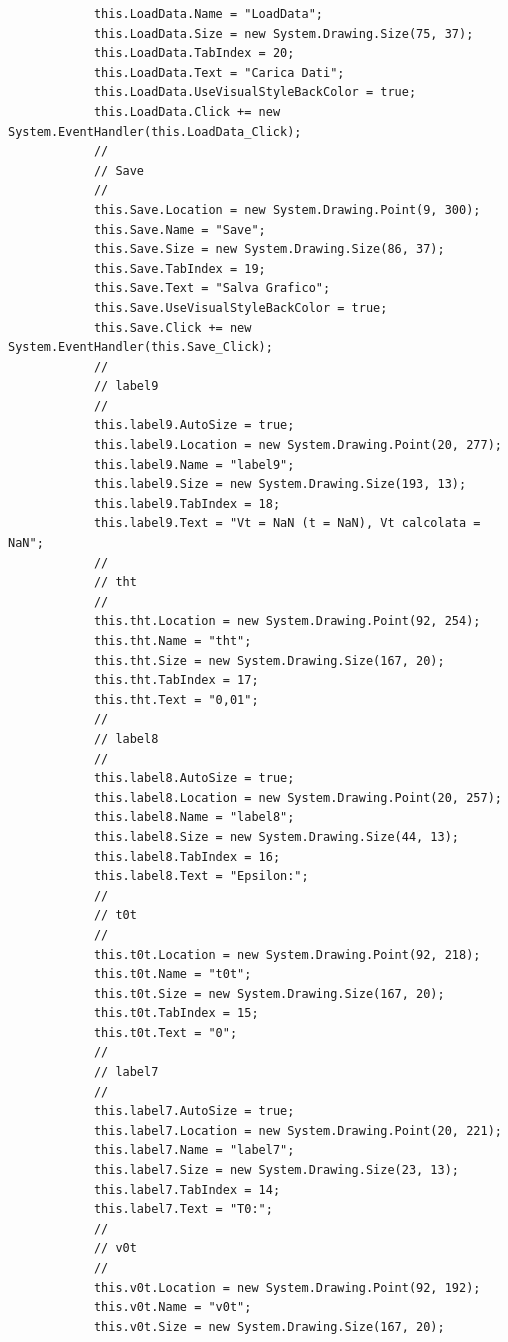 \documentclass[11pt]{article} %
\begin{document}
\begin{lstlisting}
            this.LoadData.Name = "LoadData";
            this.LoadData.Size = new System.Drawing.Size(75, 37);
            this.LoadData.TabIndex = 20;
            this.LoadData.Text = "Carica Dati";
            this.LoadData.UseVisualStyleBackColor = true;
            this.LoadData.Click += new System.EventHandler(this.LoadData_Click);
            // 
            // Save
            // 
            this.Save.Location = new System.Drawing.Point(9, 300);
            this.Save.Name = "Save";
            this.Save.Size = new System.Drawing.Size(86, 37);
            this.Save.TabIndex = 19;
            this.Save.Text = "Salva Grafico";
            this.Save.UseVisualStyleBackColor = true;
            this.Save.Click += new System.EventHandler(this.Save_Click);
            // 
            // label9
            // 
            this.label9.AutoSize = true;
            this.label9.Location = new System.Drawing.Point(20, 277);
            this.label9.Name = "label9";
            this.label9.Size = new System.Drawing.Size(193, 13);
            this.label9.TabIndex = 18;
            this.label9.Text = "Vt = NaN (t = NaN), Vt calcolata = NaN";
            // 
            // tht
            // 
            this.tht.Location = new System.Drawing.Point(92, 254);
            this.tht.Name = "tht";
            this.tht.Size = new System.Drawing.Size(167, 20);
            this.tht.TabIndex = 17;
            this.tht.Text = "0,01";
            // 
            // label8
            // 
            this.label8.AutoSize = true;
            this.label8.Location = new System.Drawing.Point(20, 257);
            this.label8.Name = "label8";
            this.label8.Size = new System.Drawing.Size(44, 13);
            this.label8.TabIndex = 16;
            this.label8.Text = "Epsilon:";
            // 
            // t0t
            // 
            this.t0t.Location = new System.Drawing.Point(92, 218);
            this.t0t.Name = "t0t";
            this.t0t.Size = new System.Drawing.Size(167, 20);
            this.t0t.TabIndex = 15;
            this.t0t.Text = "0";
            // 
            // label7
            // 
            this.label7.AutoSize = true;
            this.label7.Location = new System.Drawing.Point(20, 221);
            this.label7.Name = "label7";
            this.label7.Size = new System.Drawing.Size(23, 13);
            this.label7.TabIndex = 14;
            this.label7.Text = "T0:";
            // 
            // v0t
            // 
            this.v0t.Location = new System.Drawing.Point(92, 192);
            this.v0t.Name = "v0t";
            this.v0t.Size = new System.Drawing.Size(167, 20);

\end{lstlisting}
\end{document}
